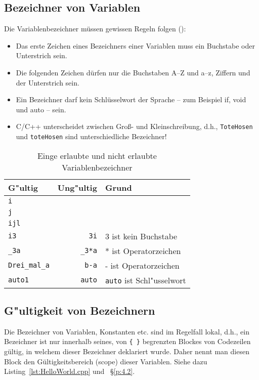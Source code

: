 \subsection{Bezeichner von Variablen}
\label{p:2.1.2}
%
Die Variablenbezeichner müssen gewissen Regeln folgen ():
\begin{itemize}
	\item Das erste Zeichen eines Bezeichners einer Variablen muss ein Buchstabe oder Unterstrich sein.
	\item Die folgenden Zeichen dürfen nur die Buchstaben A–Z und a–z, Ziffern und der Unterstrich sein.
	\item Ein Bezeichner darf kein Schlüsselwort der Sprache – zum Beispiel if, void und auto – sein.
 \item C/C++ unterscheidet zwischen Gro\ss - und Kleinschreibung, d.h.,
 	\texttt{ToteHosen} und \texttt{toteHosen} sind unterschiedliche
	Bezeichner!
\end{itemize}
%
\begin{table}[hbt]
	\label{tab:2.1.2}
\mbox{}\hfill
\begin{tabular}{l@{$\;\;$}||@{$\;\;$}r@{\qquad\qquad}p{}}
  G"ultig & Ung"ultig & Grund \\ \hline
  \texttt{i} \\
  \texttt{j} \\
  \texttt{ijl} \\
  \texttt{i3}	& \texttt{3i}	& 3 ist kein Buchstabe \\
  \texttt{\_3a}	& \texttt{\_3*a} & * ist Operatorzeichen \\
  \texttt{Drei\_mal\_a} & \texttt{b-a} & - ist Operatorzeichen \\
  \texttt{auto1} & \texttt{auto} & \texttt{auto} ist Schl"usselwort
\end{tabular}
\hfill\mbox{}
\caption{Einge erlaubte und nicht erlaubte Variablenbezeichner}
\end{table}
%
%
%
%
\subsection{G"ultigkeit von Bezeichnern}
\label{p:2.1.3}
%
Die Bezeichner von Variablen, Konstanten etc. sind im Regelfall
lokal, d.h., ein Bezeichner ist nur innerhalb seines, von \verb|{ }|
begrenzten Blockes von Codezeilen gültig, in welchem dieser Bezeichner
deklariert wurde. Daher nennt man diesen Block den
Gültigkeitsbereich (scope)
dieser Variablen.
Siehe dazu Listing~\ref{lst:HelloWorld.cpp} und ~\S\ref{p:4.2}.
%
%
